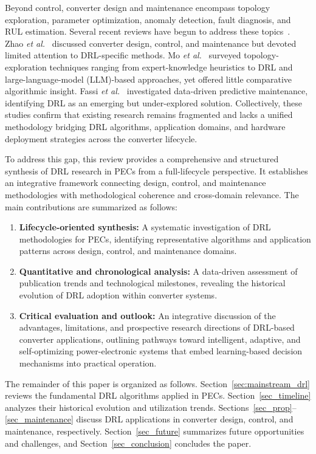 Beyond control, converter design and maintenance encompass topology exploration, parameter optimization, anomaly detection, fault diagnosis, and RUL estimation. 
Several recent reviews have begun to address these topics~\cite{zhao2020overview,mo2024power,fassi2023toward}. 
Zhao \textit{et al.}~\cite{zhao2020overview} discussed converter design, control, and maintenance but devoted limited attention to DRL-specific methods. 
Mo \textit{et al.}~\cite{mo2024power} surveyed topology-exploration techniques ranging from expert-knowledge heuristics to DRL and large-language-model (LLM)-based approaches, yet offered little comparative algorithmic insight. 
Fassi \textit{et al.}~\cite{fassi2023toward} investigated data-driven predictive maintenance, identifying DRL as an emerging but under-explored solution. 
Collectively, these studies confirm that existing research remains fragmented and lacks a unified methodology bridging DRL algorithms, application domains, and hardware deployment strategies across the converter lifecycle.

To address this gap, this review provides a comprehensive and structured synthesis of DRL research in PECs from a full-lifecycle perspective. 
It establishes an integrative framework connecting design, control, and maintenance methodologies with methodological coherence and cross-domain relevance. 
The main contributions are summarized as follows:

\begin{enumerate}
  \item \textbf{Lifecycle-oriented synthesis:} A systematic investigation of DRL methodologies for PECs, identifying representative algorithms and application patterns across design, control, and maintenance domains.  
  \item \textbf{Quantitative and chronological analysis:} A data-driven assessment of publication trends and technological milestones, revealing the historical evolution of DRL adoption within converter systems.  
  \item \textbf{Critical evaluation and outlook:} An integrative discussion of the advantages, limitations, and prospective research directions of DRL-based converter applications, outlining pathways toward intelligent, adaptive, and self-optimizing power-electronic systems that embed learning-based decision mechanisms into practical operation.  
\end{enumerate}

The remainder of this paper is organized as follows. 
Section~\ref{sec:mainstream_drl} reviews the fundamental DRL algorithms applied in PECs. 
Section~\ref{sec_timeline} analyzes their historical evolution and utilization trends. 
Sections~\ref{sec_prop}--\ref{sec_maintenance} discuss DRL applications in converter design, control, and maintenance, respectively. 
Section~\ref{sec_future} summarizes future opportunities and challenges, and Section~\ref{sec_conclusion} concludes the paper.


